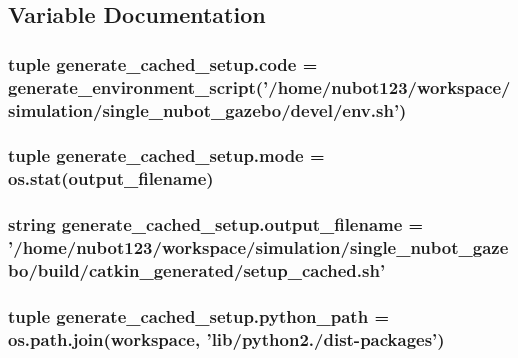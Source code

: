 \subsection{Variable Documentation}
\hypertarget{namespacegenerate__cached__setup_a4ed71aac3acd6cda6640f912559b5408}{
\subsubsection[{code}]{\setlength{\rightskip}{0pt plus 5cm}tuple generate\-\_\-cached\-\_\-setup.\-code = generate\-\_\-environment\-\_\-script('/home/nubot123/workspace/simulation/single\-\_\-nubot\-\_\-gazebo/devel/env.\-sh')}}\label{namespacegenerate__cached__setup_a4ed71aac3acd6cda6640f912559b5408}
\hypertarget{namespacegenerate__cached__setup_afd1a431f16a2a78ef0438a658e4ac3cf}{
\subsubsection[{mode}]{\setlength{\rightskip}{0pt plus 5cm}tuple generate\-\_\-cached\-\_\-setup.\-mode = os.\-stat({\bf output\-\_\-filename})}}\label{namespacegenerate__cached__setup_afd1a431f16a2a78ef0438a658e4ac3cf}
\hypertarget{namespacegenerate__cached__setup_a0265aee5075ee1eb701ff69c98ad6793}{
\subsubsection[{output\-\_\-filename}]{\setlength{\rightskip}{0pt plus 5cm}string generate\-\_\-cached\-\_\-setup.\-output\-\_\-filename = '/home/nubot123/workspace/simulation/single\-\_\-nubot\-\_\-gazebo/build/catkin\-\_\-generated/setup\-\_\-cached.\-sh'}}\label{namespacegenerate__cached__setup_a0265aee5075ee1eb701ff69c98ad6793}
\hypertarget{namespacegenerate__cached__setup_a770288702e38f06cf1b86a33bc07723e}{
\subsubsection[{python\-\_\-path}]{\setlength{\rightskip}{0pt plus 5cm}tuple generate\-\_\-cached\-\_\-setup.\-python\-\_\-path = os.\-path.\-join(workspace, 'lib/python2./dist-\/packages')}}\label{namespacegenerate__cached__setup_a770288702e38f06cf1b86a33bc07723e}
